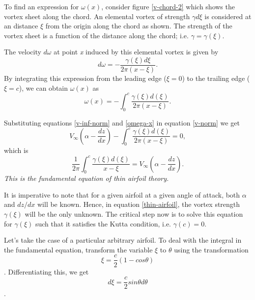 \documentclass[letterpaper,12pt]{article}
\begin{document}
To find an expression for $\omega(x)$, consider figure \ref{v-chord-2} which shows the vortex sheet along the chord. An elemental vortex of strength $\gamma d\xi$ is considered at an distance $\xi$ from the origin along the chord as shown. The strength of the vortex sheet is a function of the distance along the chord; i.e. $\gamma = \gamma(\xi)$.

The velocity $d\omega$ at point \textit{x} induced by this elemental vortex is given by
\begin{equation}
d\omega = -\frac{\gamma(\xi)d\xi}{2\pi(x-\xi)}.
\end{equation}
By integrating this expression from the leading edge ($\xi=0$) to the trailing edge ($\xi=c$), we can obtain $\omega(x)$ as
\begin{equation}
\omega(x)=- \int_{0}^{c} \frac{\gamma(\xi)d(\xi)}{2\pi(x-\xi)}
\label{omega-x}.
\end{equation}

Substituting equations \ref{v-inf-norm} and \ref{omega-x} in equation \ref{v-norm} we get
\begin{equation}
V_{\infty}\left(\alpha-\frac{dz}{dx}\right)-\int_{0}^{c} \frac{\gamma(\xi)d(\xi)}{2\pi(x-\xi)}=0,
\end{equation}
which is
\begin{equation}
\boxed{
\frac{1}{2\pi}\int_{0}^{c}\frac{\gamma(\xi)d(\xi)}{x-\xi}=V_{\infty}\left(\alpha-\frac{dz}{dx}\right).
}
\label{thin-airfoil}
\end{equation}
\textit{This is the fundamental equation of thin airfoil theory.}

It is imperative to note that for a given airfoil at a given angle of attack, both $\alpha$ and $dz/dx$ will be known. Hence, in equation \ref{thin-airfoil}, the vortex strength $\gamma(\xi)$ will be the only unknown. The critical step now is to solve this equation for $\gamma(\xi)$ such that it satisfies the Kutta condition, i.e. $\gamma(c)=0$.

Let\rq{}s take the case of a particular arbitrary airfoil. To deal with the integral in the fundamental equation, transform the variable $\xi$ to $\theta$ using the transformation
\[\xi=\frac{c}{2}(1-cos\theta)\].
Differentiating this, we get
\[d\xi=\frac{c}{2}sin\theta d\theta\].
\end{document}
